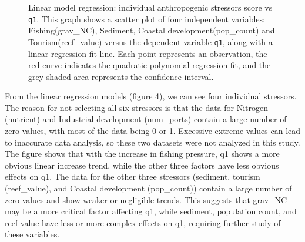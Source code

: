 \documentclass[a4paper, 11]{article}
\begin{document}
\begin{figure}[H]
    \centering
    \caption{Linear model regression: individual anthropogenic stressors score vs \texttt{q1}. This graph shows a scatter plot of four independent variables: Fishing(grav\_NC), Sediment, Coastal development(pop\_count) and Tourism(reef\_value) versus the dependent variable \texttt{q1}, along with a linear regression fit line. Each point represents an observation, the red curve indicates the quadratic polynomial regression fit, and the grey shaded area represents the confidence interval.}
\end{figure}


From the linear regression models (figure 4), we can see four individual stressors. The reason for not selecting all six stressors is that the data for Nitrogen (nutrient) and Industrial development (num\_ports) contain a large number of zero values, with most of the data being 0 or 1. Excessive extreme values can lead to inaccurate data analysis, so these two datasets were not analyzed in this study. The figure shows that with the increase in fishing pressure, q1 shows a more obvious linear increase trend, while the other three factors have less obvious effects on q1. The data for the other three stressors (sediment, tourism (reef\_value), and Coastal development (pop\_count)) contain a large number of zero values and show weaker or negligible trends. This suggests that grav\_NC may be a more critical factor affecting q1, while sediment, population count, and reef value have less or more complex effects on q1, requiring further study of these variables.
\end{document}
